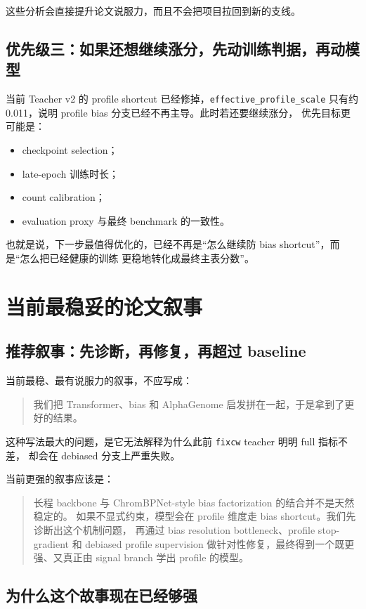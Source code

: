\documentclass[11pt,a4paper]{ctexart}
\begin{document}
这些分析会直接提升论文说服力，而且不会把项目拉回到新的支线。

\subsection{优先级三：如果还想继续涨分，先动训练判据，再动模型}

当前 Teacher v2 的 profile shortcut 已经修掉，\texttt{effective\_profile\_scale}
只有约 0.011，说明 profile bias 分支已经不再主导。此时若还要继续涨分，
优先目标更可能是：
\begin{itemize}[leftmargin=2em]
  \item checkpoint selection；
  \item late-epoch 训练时长；
  \item count calibration；
  \item evaluation proxy 与最终 benchmark 的一致性。
\end{itemize}

也就是说，下一步最值得优化的，已经不再是“怎么继续防 bias shortcut”，而是“怎么把已经健康的训练
更稳地转化成最终主表分数”。

\section{当前最稳妥的论文叙事}

\subsection{推荐叙事：先诊断，再修复，再超过 baseline}

当前最稳、最有说服力的叙事，不应写成：
\begin{quote}
我们把 Transformer、bias 和 AlphaGenome 启发拼在一起，于是拿到了更好的结果。
\end{quote}

这种写法最大的问题，是它无法解释为什么此前 \texttt{fixcw} teacher 明明 full 指标不差，
却会在 debiased 分支上严重失败。

当前更强的叙事应该是：
\begin{quote}
长程 backbone 与 ChromBPNet-style bias factorization 的结合并不是天然稳定的。
如果不显式约束，模型会在 profile 维度走 bias shortcut。我们先诊断出这个机制问题，
再通过 bias resolution bottleneck、profile stop-gradient 和 debiased profile supervision
做针对性修复，最终得到一个既更强、又真正由 signal branch 学出 profile 的模型。
\end{quote}

\subsection{为什么这个故事现在已经够强}
\end{document}
